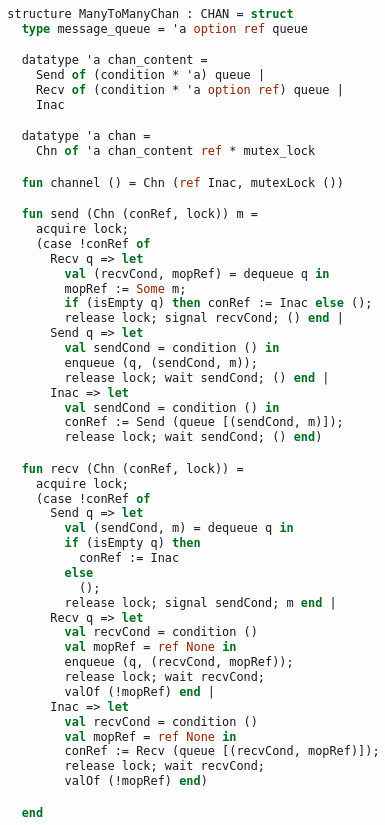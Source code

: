 \begin{lstlisting}[language=ML, style=codestyle1]

  structure ManyToManyChan : CHAN = struct
    type message_queue = 'a option ref queue

    datatype 'a chan_content = 
      Send of (condition * 'a) queue | 
      Recv of (condition * 'a option ref) queue | 
      Inac

    datatype 'a chan =
      Chn of 'a chan_content ref * mutex_lock 

    fun channel () = Chn (ref Inac, mutexLock ())

    fun send (Chn (conRef, lock)) m = 
      acquire lock;
      (case !conRef of
        Recv q => let
          val (recvCond, mopRef) = dequeue q in
          mopRef := Some m;
          if (isEmpty q) then conRef := Inac else (); 
          release lock; signal recvCond; () end |
        Send q => let
          val sendCond = condition () in
          enqueue (q, (sendCond, m));
          release lock; wait sendCond; () end |
        Inac => let
          val sendCond = condition () in
          conRef := Send (queue [(sendCond, m)]);
          release lock; wait sendCond; () end)

    fun recv (Chn (conRef, lock)) =  
      acquire lock;
      (case !conRef of 
        Send q => let
          val (sendCond, m) = dequeue q in
          if (isEmpty q) then
            conRef := Inac
          else
            (); 
          release lock; signal sendCond; m end |
        Recv q => let
          val recvCond = condition ()
          val mopRef = ref None in
          enqueue (q, (recvCond, mopRef));
          release lock; wait recvCond;
          valOf (!mopRef) end |
        Inac => let
          val recvCond = condition ()
          val mopRef = ref None in
          conRef := Recv (queue [(recvCond, mopRef)]);
          release lock; wait recvCond;
          valOf (!mopRef) end)

    end

  \end{lstlisting}

